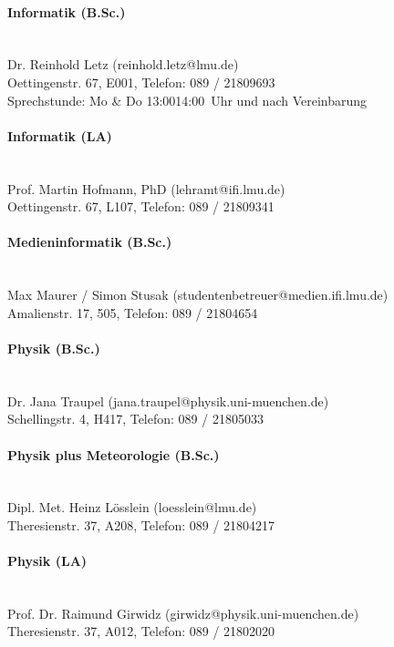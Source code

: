 \paragraph{Informatik (B.Sc.)}\hfill\\
Dr. Reinhold Letz (reinhold.letz@lmu.de)\\
Oettingenstr. 67, E001, Telefon: 089 / 2180\emd{}9693\\
Sprechstunde: Mo \& Do 13:00\emd{}14:00~Uhr und nach Vereinbarung

\paragraph{Informatik (LA)}\hfill\\
Prof. Martin Hofmann, PhD (lehramt@ifi.lmu.de)\\
Oettingenstr. 67, L107, Telefon: 089 / 2180\emd{}9341

\paragraph{Medieninformatik (B.Sc.)}\hfill\\
Max Maurer / Simon Stusak (studentenbetreuer@medien.ifi.lmu.de)\\
Amalienstr. 17, 505, Telefon: 089 / 2180\emd{}4654

\paragraph{Physik (B.Sc.)}\hfill\\
Dr. Jana Traupel (jana.traupel@physik.uni-muenchen.de)\\
Schellingstr. 4, H417, Telefon: 089 / 2180\emd{}5033

\paragraph{Physik plus Meteorologie (B.Sc.)}\hfill\\
Dipl. Met. Heinz Lösslein (loesslein@lmu.de)\\
Theresienstr. 37, A208, Telefon: 089 / 2180\emd{}4217

\paragraph{Physik (LA)}\hfill\\
Prof. Dr. Raimund Girwidz (girwidz@physik.uni-muenchen.de)\\
Theresienstr. 37, A012, Telefon: 089 / 2180\emd{}2020



